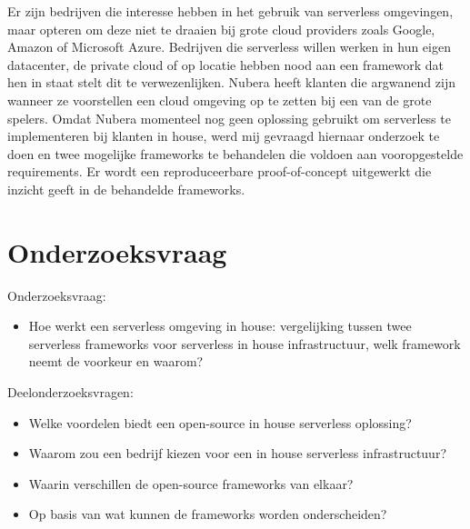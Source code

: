 Er zijn bedrijven die interesse hebben in het gebruik van serverless omgevingen, maar opteren om deze niet te draaien bij grote cloud providers zoals Google, Amazon of Microsoft Azure. Bedrijven die serverless willen werken in hun eigen datacenter, de private cloud of op locatie hebben nood aan een framework dat hen in staat stelt dit te verwezenlijken. Nubera heeft klanten die argwanend zijn wanneer ze voorstellen een cloud omgeving op te zetten bij een van de grote spelers. Omdat Nubera momenteel nog geen oplossing gebruikt om serverless te implementeren bij klanten in house, werd mij gevraagd hiernaar onderzoek te doen en twee mogelijke frameworks te behandelen die voldoen aan vooropgestelde requirements. Er wordt een reproduceerbare proof-of-concept uitgewerkt die inzicht geeft in de behandelde frameworks.

\section{Onderzoeksvraag}
\label{sec:onderzoeksvraag}


Onderzoeksvraag: 
\begin{itemize}
    \item Hoe werkt een serverless omgeving in house: vergelijking tussen twee serverless frameworks  voor serverless in house infrastructuur, welk framework neemt de voorkeur en waarom?
\end{itemize}

Deelonderzoeksvragen: 
\begin{itemize}
    \item Welke voordelen biedt een open-source in house serverless oplossing?
    \item Waarom zou een bedrijf kiezen voor een in house serverless infrastructuur?
    \item Waarin verschillen de open-source frameworks van elkaar?
    \item Op basis van wat kunnen de frameworks worden onderscheiden? 
\end{itemize}

